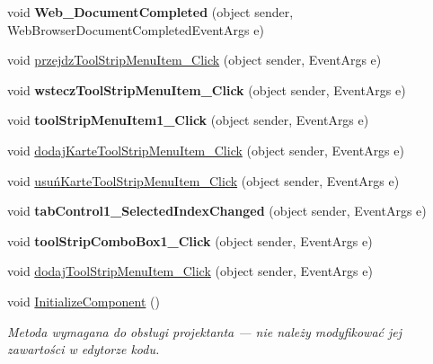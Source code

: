 \begin{DoxyCompactItemize}
\item 
\mbox{\label{class_windows_forms_app2_1_1_przegladarka_ab0b9d9fb2c8ac43d3db70ed17e913813}} 
void {\bfseries Web\+\_\+\+Document\+Completed} (object sender, Web\+Browser\+Document\+Completed\+Event\+Args e)
\item 
void \hyperlink{class_windows_forms_app2_1_1_przegladarka_a0426aa03eb6aa34e371a649c317a6995}{przejdz\+Tool\+Strip\+Menu\+Item\+\_\+\+Click} (object sender, Event\+Args e)
\item 
\mbox{\label{class_windows_forms_app2_1_1_przegladarka_add440881c3f047aa654c6e992f84dac8}} 
void {\bfseries wstecz\+Tool\+Strip\+Menu\+Item\+\_\+\+Click} (object sender, Event\+Args e)
\item 
\mbox{\label{class_windows_forms_app2_1_1_przegladarka_a6e7bcbe6a5b31132e29787c80b663d02}} 
void {\bfseries tool\+Strip\+Menu\+Item1\+\_\+\+Click} (object sender, Event\+Args e)
\item 
void \hyperlink{class_windows_forms_app2_1_1_przegladarka_a1a65fd7d680f3af4d036af3992129a81}{dodaj\+Karte\+Tool\+Strip\+Menu\+Item\+\_\+\+Click} (object sender, Event\+Args e)
\item 
void \hyperlink{class_windows_forms_app2_1_1_przegladarka_ac405fedd591d91fba5dadc8d0b3b2419}{usuń\+Karte\+Tool\+Strip\+Menu\+Item\+\_\+\+Click} (object sender, Event\+Args e)
\item 
\mbox{\label{class_windows_forms_app2_1_1_przegladarka_a1b8caaa571e0f20423e36048bebe658d}} 
void {\bfseries tab\+Control1\+\_\+\+Selected\+Index\+Changed} (object sender, Event\+Args e)
\item 
\mbox{\label{class_windows_forms_app2_1_1_przegladarka_a7c9a987ad2c6d99e4b8744247939b447}} 
void {\bfseries tool\+Strip\+Combo\+Box1\+\_\+\+Click} (object sender, Event\+Args e)
\item 
void \hyperlink{class_windows_forms_app2_1_1_przegladarka_a44c5511659d6a003813e4efc5308a69c}{dodaj\+Tool\+Strip\+Menu\+Item\+\_\+\+Click} (object sender, Event\+Args e)
\item 
void \hyperlink{class_windows_forms_app2_1_1_przegladarka_a16d94dcbfce3b5319ae8b36f0d9fe26b}{Initialize\+Component} ()
\begin{DoxyCompactList}\small\item\em Metoda wymagana do obsługi projektanta — nie należy modyfikować jej zawartości w edytorze kodu. \end{DoxyCompactList}\end{DoxyCompactItemize}
